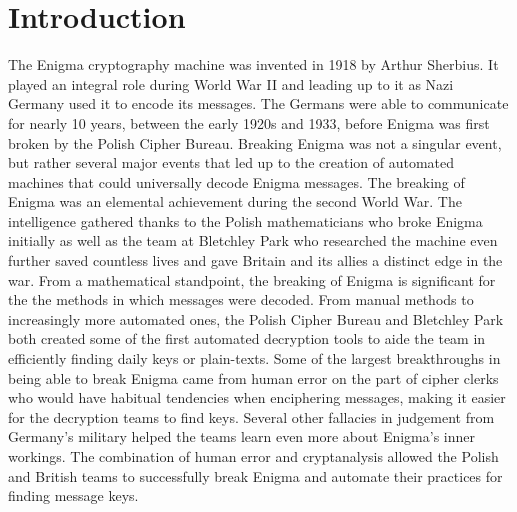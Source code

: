 \chapter{Introduction}\label{chap:introduction}

The Enigma cryptography machine was invented in 1918 by Arthur Sherbius. It played an integral role during World War II and leading up to it as Nazi Germany used it to encode its messages. The Germans were able to communicate for nearly 10 years, between the early 1920s and 1933, before Enigma was first broken by the Polish Cipher Bureau. Breaking Enigma was not a singular event, but rather several major events that led up to the creation of automated machines that could universally decode Enigma messages. The breaking of Enigma was an elemental achievement during the second World War. The intelligence gathered thanks to the Polish mathematicians who broke Enigma initially as well as the team at Bletchley Park who researched the machine even further saved countless lives and gave Britain and its allies a distinct edge in the war. From a mathematical standpoint, the breaking of Enigma is significant for the the methods in which messages were decoded. From manual methods to increasingly more automated ones, the Polish Cipher Bureau and Bletchley Park both created some of the first automated decryption tools to aide the team in efficiently finding daily keys or plain-texts. Some of the largest breakthroughs in being able to break Enigma came from human error on the part of cipher clerks who would have habitual tendencies when enciphering messages, making it easier for the decryption teams to find keys. Several other fallacies in judgement from Germany’s military helped the teams learn even more about Enigma’s inner workings. The combination of human error and cryptanalysis allowed the Polish and British teams to successfully break Enigma and automate their practices for finding message keys.
\begingroup
\renewcommand{\cleardoublepage}{}
\renewcommand{\clearpage}{}